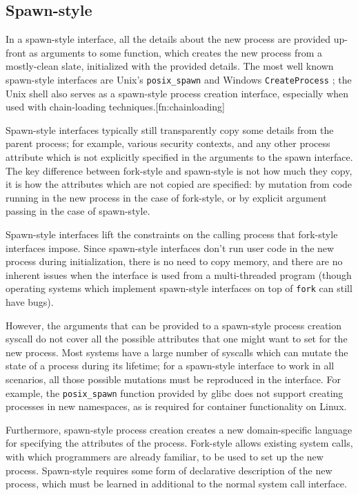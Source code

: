 \documentclass{acmart}
\begin{document}
\subsection{Spawn-style}
In a spawn-style interface,
all the details about the new process are provided up-front as arguments to some function,
which creates the new process from a mostly-clean slate, initialized with the provided details.
The most well known spawn-style interfaces are Unix's \texttt{posix\_spawn} \cite{posix_spawn}
and Windows \texttt{CreateProcess} \cite{create_process};
the Unix shell also serves as a spawn-style process creation interface,
especially when used with chain-loading techniques.[fn:chainloading]

Spawn-style interfaces typically still transparently copy some details from the parent process;
for example, various security contexts,
and any other process attribute which is not explicitly specified in the arguments to the spawn interface.
The key difference between fork-style and spawn-style is not how much they copy,
it is how the attributes which are not copied are specified:
by mutation from code running in the new process in the case of fork-style,
or by explicit argument passing in the case of spawn-style.

Spawn-style interfaces lift the constraints on the calling process that fork-style interfaces impose.
Since spawn-style interfaces don't run user code in the new process during initialization,
there is no need to copy memory,
and there are no inherent issues when the interface is used from a multi-threaded program
(though operating systems which implement spawn-style interfaces on top of \texttt{fork} can still have bugs).

However, the arguments that can be provided to a spawn-style process creation syscall
do not cover all the possible attributes that one might want to set for the new process.
Most systems have a large number of syscalls which can mutate the state of a process during its lifetime;
for a spawn-style interface to work in all scenarios,
all those possible mutations must be reproduced in the interface.
For example, the \texttt{posix\_spawn} function provided by glibc does not support creating processes in new namespaces,
as is required for container functionality on Linux.

Furthermore, spawn-style process creation
creates a new domain-specific language for specifying the attributes of the process.
Fork-style allows existing system calls,
with which programmers are already familiar,
to be used to set up the new process.
Spawn-style requires some form of declarative description of the new process,
which must be learned in additional to the normal system call interface.
\end{document}
